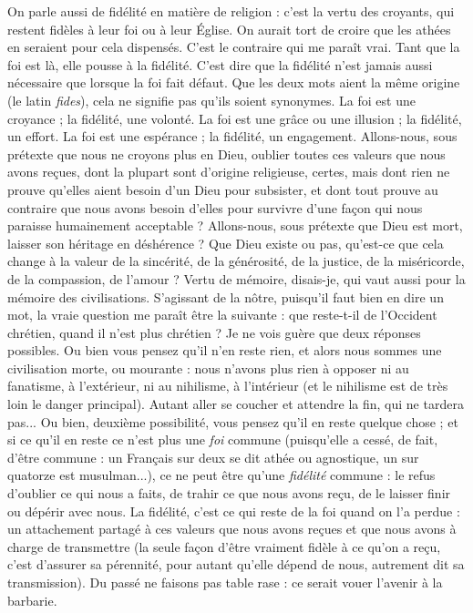 On parle aussi de fidélité en matière de religion : c’est la vertu des croyants,
qui restent fidèles à leur foi ou à leur Église. On aurait tort de croire que les
athées en seraient pour cela dispensés. C’est le contraire qui me paraît vrai.
Tant que la foi est là, elle pousse à la fidélité. C’est dire que la fidélité n’est
jamais aussi nécessaire que lorsque la foi fait défaut. Que les deux mots aient la
même origine (le latin {\it fides}), cela ne signifie pas qu’ils soient synonymes. La foi
est une croyance ; la fidélité, une volonté. La foi est une grâce ou une illusion ;
la fidélité, un effort. La foi est une espérance ; la fidélité, un engagement.
Allons-nous, sous prétexte que nous ne croyons plus en Dieu, oublier toutes ces
valeurs que nous avons reçues, dont la plupart sont d’origine religieuse, certes,
mais dont rien ne prouve qu’elles aient besoin d’un Dieu pour subsister, et
dont tout prouve au contraire que nous avons besoin d’elles pour survivre
d’une façon qui nous paraisse humainement acceptable ? Allons-nous, sous
prétexte que Dieu est mort, laisser son héritage en déshérence ? Que Dieu
existe ou pas, qu'est-ce que cela change à la valeur de la sincérité, de la générosité,
de la justice, de la miséricorde, de la compassion, de l'amour ? Vertu de
mémoire, disais-je, qui vaut aussi pour la mémoire des civilisations. S'agissant
de la nôtre, puisqu'il faut bien en dire un mot, la vraie question me paraît être
la suivante : que reste-t-il de l'Occident chrétien, quand il n’est plus chrétien ?
Je ne vois guère que deux réponses possibles. Ou bien vous pensez qu’il n’en
reste rien, et alors nous sommes une civilisation morte, ou mourante : nous
n'avons plus rien à opposer ni au fanatisme, à l’extérieur, ni au nihilisme, à
l'intérieur (et le nihilisme est de très loin le danger principal). Autant aller se
coucher et attendre la fin, qui ne tardera pas... Ou bien, deuxième possibilité,
vous pensez qu’il en reste quelque chose ; et si ce qu’il en reste ce n’est plus une
{\it foi} commune (puisqu'elle a cessé, de fait, d’être commune : un Français sur
deux se dit athée ou agnostique, un sur quatorze est musulman...), ce ne peut
être qu’une {\it fidélité} commune : le refus d’oublier ce qui nous a faits, de trahir ce
que nous avons reçu, de le laisser finir ou dépérir avec nous. La fidélité, c’est ce
qui reste de la foi quand on l’a perdue : un attachement partagé à ces valeurs
que nous avons reçues et que nous avons à charge de transmettre (la seule façon
d’être vraiment fidèle à ce qu’on a reçu, c’est d’assurer sa pérennité, pour autant
qu’elle dépend de nous, autrement dit sa transmission). Du passé ne faisons pas
table rase : ce serait vouer l’avenir à la barbarie.


